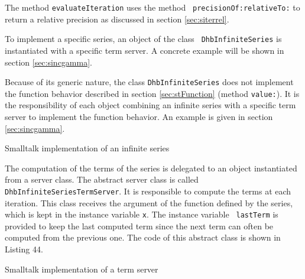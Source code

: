 \documentclass[twoside]{book}
\begin{document}
The method {\tt evaluateIteration} uses the method {\tt
precisionOf:relativeTo:} to return a relative precision as
discussed in section \ref{sec:siterrel}.

To implement a specific series, an object of the class {\tt
DhbInfiniteSeries} is instantiated with a specific term server. A
concrete example will be shown in section \ref{sec:sincgamma}.

Because of its generic nature, the class {\tt DhbInfiniteSeries}
does not implement the function behavior described in section
\ref{sec:stFunction} (method {\tt value:}). It is the
responsibility of each object combining an infinite series with a
specific term server to implement the function behavior. An
example is given in section \ref{sec:sincgamma}.
\begin{listing} Smalltalk implementation of an infinite series \label{ls:infseries}

\end{listing}
The computation of the terms of the series is delegated to an
object instantiated from a server class. The abstract server class
is called {\tt DhbInfiniteSeriesTermServer}. It is responsible to
compute the terms at each iteration. This class receives the
argument of the function defined by the series, which is kept in
the instance variable {\tt x}. The instance variable {\tt
lastTerm} is provided to keep the last computed term since the
next term can often be computed from the previous one. The code of
this abstract class is shown in Listing 44.
\begin{listing} Smalltalk implementation of a term server \label{ls:termserver}

\end{listing}
\end{document}
